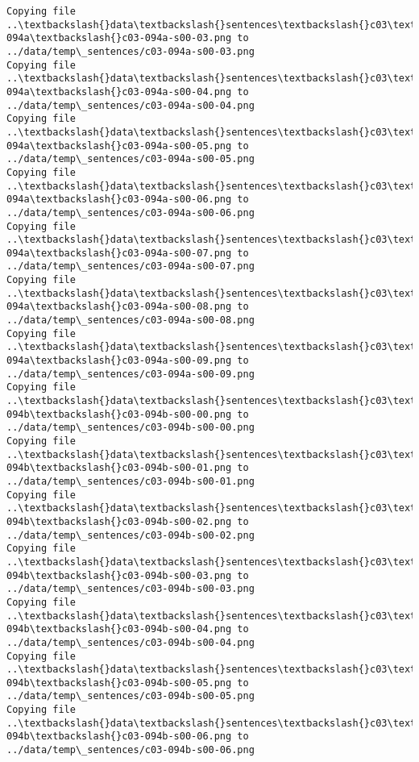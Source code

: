 \documentclass[11pt]{article}
\begin{document}
\begin{Verbatim}[commandchars=\\\{\}]
Copying file ..\textbackslash{}data\textbackslash{}sentences\textbackslash{}c03\textbackslash{}c03-094a\textbackslash{}c03-094a-s00-03.png to
../data/temp\_sentences/c03-094a-s00-03.png
Copying file ..\textbackslash{}data\textbackslash{}sentences\textbackslash{}c03\textbackslash{}c03-094a\textbackslash{}c03-094a-s00-04.png to
../data/temp\_sentences/c03-094a-s00-04.png
Copying file ..\textbackslash{}data\textbackslash{}sentences\textbackslash{}c03\textbackslash{}c03-094a\textbackslash{}c03-094a-s00-05.png to
../data/temp\_sentences/c03-094a-s00-05.png
Copying file ..\textbackslash{}data\textbackslash{}sentences\textbackslash{}c03\textbackslash{}c03-094a\textbackslash{}c03-094a-s00-06.png to
../data/temp\_sentences/c03-094a-s00-06.png
Copying file ..\textbackslash{}data\textbackslash{}sentences\textbackslash{}c03\textbackslash{}c03-094a\textbackslash{}c03-094a-s00-07.png to
../data/temp\_sentences/c03-094a-s00-07.png
Copying file ..\textbackslash{}data\textbackslash{}sentences\textbackslash{}c03\textbackslash{}c03-094a\textbackslash{}c03-094a-s00-08.png to
../data/temp\_sentences/c03-094a-s00-08.png
Copying file ..\textbackslash{}data\textbackslash{}sentences\textbackslash{}c03\textbackslash{}c03-094a\textbackslash{}c03-094a-s00-09.png to
../data/temp\_sentences/c03-094a-s00-09.png
Copying file ..\textbackslash{}data\textbackslash{}sentences\textbackslash{}c03\textbackslash{}c03-094b\textbackslash{}c03-094b-s00-00.png to
../data/temp\_sentences/c03-094b-s00-00.png
Copying file ..\textbackslash{}data\textbackslash{}sentences\textbackslash{}c03\textbackslash{}c03-094b\textbackslash{}c03-094b-s00-01.png to
../data/temp\_sentences/c03-094b-s00-01.png
Copying file ..\textbackslash{}data\textbackslash{}sentences\textbackslash{}c03\textbackslash{}c03-094b\textbackslash{}c03-094b-s00-02.png to
../data/temp\_sentences/c03-094b-s00-02.png
Copying file ..\textbackslash{}data\textbackslash{}sentences\textbackslash{}c03\textbackslash{}c03-094b\textbackslash{}c03-094b-s00-03.png to
../data/temp\_sentences/c03-094b-s00-03.png
Copying file ..\textbackslash{}data\textbackslash{}sentences\textbackslash{}c03\textbackslash{}c03-094b\textbackslash{}c03-094b-s00-04.png to
../data/temp\_sentences/c03-094b-s00-04.png
Copying file ..\textbackslash{}data\textbackslash{}sentences\textbackslash{}c03\textbackslash{}c03-094b\textbackslash{}c03-094b-s00-05.png to
../data/temp\_sentences/c03-094b-s00-05.png
Copying file ..\textbackslash{}data\textbackslash{}sentences\textbackslash{}c03\textbackslash{}c03-094b\textbackslash{}c03-094b-s00-06.png to
../data/temp\_sentences/c03-094b-s00-06.png

\end{Verbatim}
\end{document}
